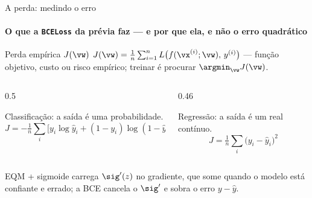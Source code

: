 \documentclass[aspectratio=169, 11pt]{beamer}
\begin{document}
\begin{frame}{A perda: medindo o erro}
  \framesubtitle{O que a \texttt{BCELoss} da prévia faz — e por que ela, e não o erro quadrático}

  \begin{defbox}{Perda empírica $J(\vw)$}
    \small \(J(\vw) = \frac{1}{n}\sum_{i=1}^{n}
    L\bigl(f(\vx^{(i)}; \vw),\, y^{(i)}\bigr)\) — função objetivo, custo ou
    risco empírico; treinar é procurar \(\argmin_{\vw} J(\vw)\).
  \end{defbox}

  \begin{columns}[T]
    \begin{column}{0.5\textwidth}
      \begin{tcolorbox}[iccaixa=icCiano, title={Entropia cruzada binária}]
        \footnotesize Classificação: a saída é uma probabilidade.
        \footnotesize\[ J = -\tfrac{1}{n}\sum_{i}
           \bigl[y_i\log \hat y_i + (1-y_i)\log(1-\hat y_i)\bigr] \]
      \end{tcolorbox}
    \end{column}
    \begin{column}{0.46\textwidth}
      \begin{tcolorbox}[iccaixa=icAzulClaro, title={Erro quadrático médio}]
        \footnotesize Regressão: a saída é um real contínuo.
        \footnotesize\[ J = \tfrac{1}{n}\sum_{i} \bigl(y_i - \hat y_i\bigr)^{2} \]
      \end{tcolorbox}
    \end{column}
  \end{columns}

  \begin{alertabox}
    EQM + sigmoide carrega $\sig'(z)$ no gradiente, que some quando o modelo
    está confiante e errado; a BCE cancela o $\sig'$ e sobra o erro
    $y - \hat y$.
  \end{alertabox}
\end{frame}
\end{document}
